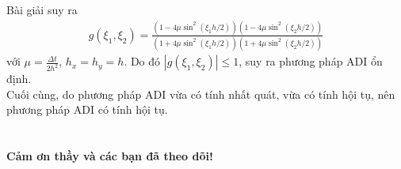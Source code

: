 \documentclass[9pt]{beamer}
\numberwithin{equation}{section}
\begin{document}
\begin{frame}
\begin{exampleblock}{Bài giải}
    suy ra
    \begin{align*}
        g(\xi_1, \xi_2) =
        \frac{\left(
            1 - 4 \mu \sin^2 \left(\xi_1 h/2\right)
        \right)\left(
            1 - 4 \mu \sin^2 \left(\xi_2 h/2\right)
        \right)}
        {\left(
            1 + 4 \mu \sin^2 \left(\xi_1 h/2\right)
        \right)\left(
            1 + 4 \mu \sin^2 \left(\xi_2 h/2\right)
        \right)}
    \end{align*}
    với $\mu = \frac{\Delta t}{2h^2}$, $h_x = h_y = h$. Do đó $|g(\xi_1, \xi_2)| \le 1$, suy ra phương pháp ADI ổn định. \\

    Cuối cùng, do phương pháp ADI vừa có tính nhất quát, vừa có tính hội tụ, nên phương pháp ADI có tính hội tụ.
\end{exampleblock}
\end{frame}

\section{}

\begin{frame}
    \begin{center}
        \Huge {\bf Cảm ơn thầy và các bạn đã theo dõi!}
    \end{center}
\end{frame}
\end{document}
